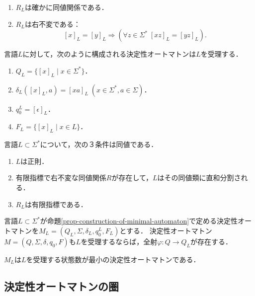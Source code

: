 \documentclass[uplatex, dvipdfmx]{jsreport}
\begin{document}
\begin{proposition}\mbox{}
    \begin{enumerate}
        \item $R_L$は確かに同値関係である．
        \item $R_L$は右不変である：
        \[ [x]_L=[y]_L\Rightarrow (\forall z\in\Sigma^*\;[xz]_L=[yz]_L). \]
    \end{enumerate}
\end{proposition}

\begin{proposition}\label{prop-construction-of-minimal-automaton}
    言語$L$に対して，次のように構成される決定性オートマトンは$L$を受理する．
    \begin{enumerate}
        \item $Q_L=\{[x]_L\mid x\in\Sigma^*\}$．
        \item $\delta_L([x]_L,a)=[xa]_L\;(x\in\Sigma^*,a\in\Sigma)$．
        \item $q_0^L=[\epsilon]_L$．
        \item $F_L=\{[x]_L\mid x\in L\}$．
    \end{enumerate}
\end{proposition}

\begin{theorem}
    言語$L\subset\Sigma^*$について，次の３条件は同値である．
    \begin{enumerate}
        \item $L$は正則．
        \item 有限指標で右不変な同値関係$R$が存在して，$L$はその同値類に直和分割される．
        \item $R_L$は有限指標である．
    \end{enumerate}
\end{theorem}

\begin{theorem}
    言語$L\subset\Sigma^*$が命題\ref{prop-construction-of-minimal-automaton}で定める決定性オートマトンを$M_L=(Q_L,\Sigma,\delta_L,q_0^L,F_L)$とする．
    決定性オートマトン$M=(Q,\Sigma,\delta,q_0,F)$も$L$を受理するならば，全射$\varphi:Q\to Q_L$が存在する．
\end{theorem}

\begin{corollary}
    $M_L$は$L$を受理する状態数が最小の決定性オートマトンである．
\end{corollary}

\subsection{決定性オートマトンの圏}
\end{document}
